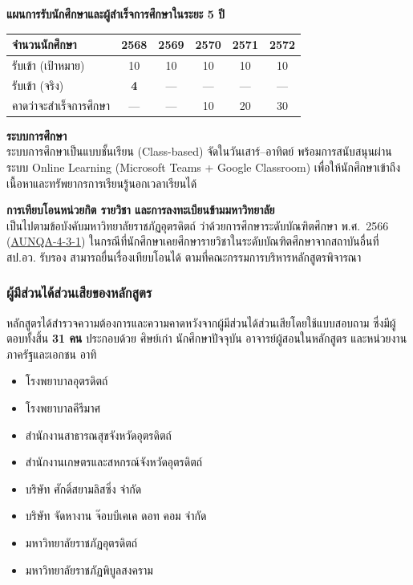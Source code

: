 \textbf{แผนการรับนักศึกษาและผู้สำเร็จการศึกษาในระยะ 5 ปี}

\begingroup
\footnotesize
\setlength{\tabcolsep}{4pt}
\renewcommand{\arraystretch}{1.2}
\begin{tabularx}{\linewidth}{|>{\raggedright\arraybackslash}X|c|c|c|c|c|}
  \hline
  \rowcolor{gray!15}
  \textbf{จำนวนนักศึกษา} & \textbf{2568} & \textbf{2569} & \textbf{2570} & \textbf{2571} & \textbf{2572} \\
  \hline
  รับเข้า (เป้าหมาย) & 10 & 10 & 10 & 10 & 10 \\
  \hline
  รับเข้า (จริง) & \textbf{4} & --- & --- & --- & --- \\
  \hline
  คาดว่าจะสำเร็จการศึกษา & --- & --- & 10 & 20 & 30 \\
  \hline
\end{tabularx}
\endgroup

\textbf{ระบบการศึกษา}\\
ระบบการศึกษาเป็นแบบชั้นเรียน (Class-based) จัดในวันเสาร์--อาทิตย์ พร้อมการสนับสนุนผ่านระบบ Online Learning (Microsoft Teams + Google Classroom) เพื่อให้นักศึกษาเข้าถึงเนื้อหาและทรัพยากรการเรียนรู้นอกเวลาเรียนได้

\textbf{การเทียบโอนหน่วยกิต รายวิชา และการลงทะเบียนข้ามมหาวิทยาลัย}\\
เป็นไปตามข้อบังคับมหาวิทยาลัยราชภัฏอุตรดิตถ์ ว่าด้วยการศึกษาระดับบัณฑิตศึกษา พ.ศ.~2566 (\hyperlink{ref:AUNQA-4-3-1}{AUNQA-4-3-1}) ในกรณีที่นักศึกษาเคยศึกษารายวิชาในระดับบัณฑิตศึกษาจากสถาบันอื่นที่ สป.อว. รับรอง สามารถยื่นเรื่องเทียบโอนได้ ตามที่คณะกรรมการบริหารหลักสูตรพิจารณา

\subsubsection*{ผู้มีส่วนได้ส่วนเสียของหลักสูตร}

หลักสูตรได้สำรวจความต้องการและความคาดหวังจากผู้มีส่วนได้ส่วนเสียโดยใช้แบบสอบถาม ซึ่งมีผู้ตอบทั้งสิ้น \textbf{31 คน} ประกอบด้วย ศิษย์เก่า นักศึกษาปัจจุบัน อาจารย์ผู้สอนในหลักสูตร และหน่วยงานภาครัฐและเอกชน อาทิ

\begin{itemize}
  \item โรงพยาบาลอุตรดิตถ์
  \item โรงพยาบาลคีรีมาศ
  \item สำนักงานสาธารณสุขจังหวัดอุตรดิตถ์
  \item สำนักงานเกษตรและสหกรณ์จังหวัดอุตรดิตถ์
  \item บริษัท ศักดิ์สยามลิสซิ่ง จำกัด
  \item บริษัท จัดหางาน จ๊อบบีเคเค ดอท คอม จำกัด
  \item มหาวิทยาลัยราชภัฏอุตรดิตถ์
  \item มหาวิทยาลัยราชภัฏพิบูลสงคราม
\end{itemize}


